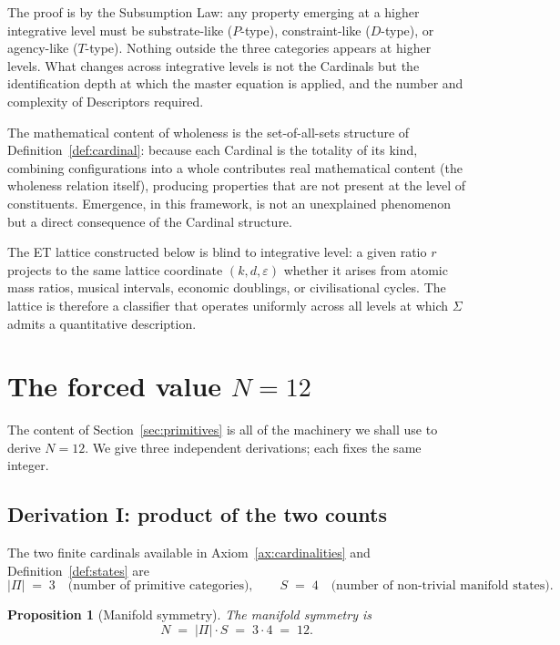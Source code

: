 \documentclass[11pt,a4paper]{article}
\newtheorem{proposition}[theorem]{Proposition}
\theoremstyle{definition}
\theoremstyle{remark}
\begin{document}
The proof is by the Subsumption Law: any property emerging at a higher integrative level must be substrate-like ($P$-type), constraint-like ($D$-type), or agency-like ($T$-type). Nothing outside the three categories appears at higher levels. What changes across integrative levels is not the Cardinals but the identification depth at which the master equation is applied, and the number and complexity of Descriptors required.

The mathematical content of wholeness is the set-of-all-sets structure of Definition~\ref{def:cardinal}: because each Cardinal is the totality of its kind, combining configurations into a whole contributes real mathematical content (the wholeness relation itself), producing properties that are not present at the level of constituents. Emergence, in this framework, is not an unexplained phenomenon but a direct consequence of the Cardinal structure.

The ET lattice constructed below is blind to integrative level: a given ratio $r$ projects to the same lattice coordinate $(k,d,\varepsilon)$ whether it arises from atomic mass ratios, musical intervals, economic doublings, or civilisational cycles. The lattice is therefore a classifier that operates uniformly across all levels at which $\Sigma$ admits a quantitative description.

\section{The forced value \texorpdfstring{$N=12$}{N=12}}\label{sec:N12}

The content of Section~\ref{sec:primitives} is all of the machinery we shall use to derive $N=12$. We give three independent derivations; each fixes the same integer.

\subsection{Derivation I: product of the two counts}

The two finite cardinals available in Axiom~\ref{ax:cardinalities} and Definition~\ref{def:states} are
\[
|\Pi| \;=\; 3 \quad\text{(number of primitive categories)}, \qquad S \;=\; 4 \quad\text{(number of non-trivial manifold states)}.
\]

\begin{proposition}[Manifold symmetry]\label{prop:N12}
The \emph{manifold symmetry} is
\[
N \;=\; |\Pi|\cdot S \;=\; 3\cdot 4 \;=\; 12.
\]
\end{proposition}
\end{document}
